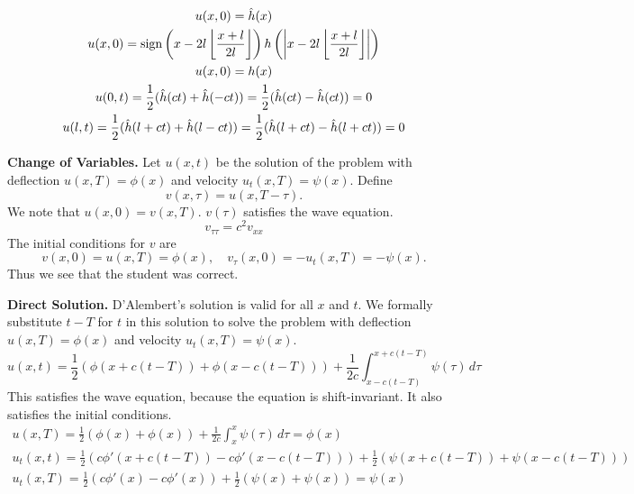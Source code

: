 {\begin{Solution}
\begin{enumerate}
\begin{gather*}
      u(x,0) = \hat{h}(x) \\
      u(x,0) =  \mathop{\mathrm{sign}}\nolimits \left( x - 2 l \left\lfloor 
          \frac{x+l}{2l} \right\rfloor \right) 
      h\left( \left| x - 2 l \left\lfloor 
            \frac{x+l}{2l} \right\rfloor\right|\right)\\
      u(x,0) = h(x) \\
      u(0,t) = \frac{1}{2} (\hat{h}(c t) + \hat{h}(- c t))
      = \frac{1}{2} (\hat{h}(c t) - \hat{h}(c t))
      = 0 \\
      u(l,t) = \frac{1}{2} (\hat{h}(l + c t) + \hat{h}(l - c t))
      = \frac{1}{2} (\hat{h}(l + c t) - \hat{h}(l + c t))
      = 0 
    \end{gather*}
  \end{enumerate}
\end{Solution}





\begin{Solution}
  \textbf{Change of Variables.}
  Let $u(x,t)$ be the solution of the problem with
  deflection $u(x,T) = \phi(x)$ and velocity $u_t(x,T) = \psi(x)$.
  Define
  \[
  v(x,\tau) = u(x,T-\tau).
  \]
  We note that $u(x,0) = v(x,T)$.  $v(\tau)$ satisfies the wave equation.
  \[
  v_{\tau\tau} = c^2 v_{x x}
  \]
  The initial conditions for $v$ are
  \[
  v(x,0) = u(x,T) = \phi(x), \quad v_\tau(x,0) = -u_t(x,T) = -\psi(x).
  \]
  Thus we see that the student was correct.

  \textbf{Direct Solution.}
  D'Alembert's solution is valid for all $x$ and $t$.  We formally 
  substitute $t-T$ for $t$ in this solution to solve the problem with
  deflection $u(x,T) = \phi(x)$ and velocity $u_t(x,T) = \psi(x)$.
  \[
  u(x,t) = \frac{1}{2} \left( \phi(x+c(t-T)) + \phi(x-c(t-T)) \right) + 
  \frac{1}{2c} \int_{x-c(t-T)}^{x+c(t-T)} \psi(\tau) \,d\tau
  \]
  This satisfies the wave equation, because the equation is 
  shift-invariant.  It also satisfies the initial conditions.
  \begin{gather*}
    u(x,T) = \frac{1}{2} \left( \phi(x) + \phi(x) \right) + 
    \frac{1}{2c} \int_{x}^{x} \psi(\tau) \,d\tau
    = \phi(x) \\
    u_t(x,t) = \frac{1}{2} \left( c \phi'(x+c(t-T)) - c \phi'(x-c(t-T)) \right) + 
    \frac{1}{2} \left( \psi(x+c(t-T)) + \psi(x-c(t-T)) \right) \\
    u_t(x,T) = \frac{1}{2} \left( c \phi'(x) - c \phi'(x) \right) + 
    \frac{1}{2} \left( \psi(x) + \psi(x) \right) 
    = \psi(x) 
  \end{gather*}
\end{Solution}








}
